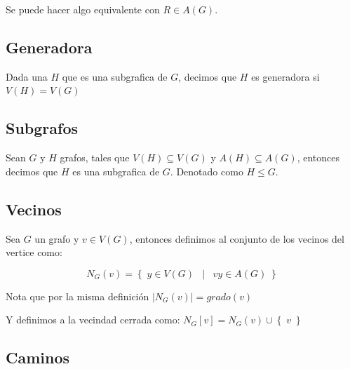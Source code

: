 \documentclass[12pt, fleqn]{report}                             %
\DeclareMathOperator \Space     {\quad}                         %
\DeclareMathOperator \MiniSpace {\;}                            %
\newcommand \Such           {\MiniSpace | \MiniSpace}           %
\theoremstyle{break}                                            %
\newcommand{\Set}[1]            {\left\{ \; #1 \; \right\}}     %
\begin{document}
                Se puede hacer algo equivalente con $R \in A(G)$.

            \subsection{Generadora}

                Dada una $H$ que es una subgrafica de $G$, decimos que $H$ es generadora si $V(H) = V(G)$


            \subsection{Subgrafos}

                Sean $G$ y $H$ grafos, tales que $V(H) \subseteq V(G)$ y $A(H) \subseteq A(G)$, entonces decimos que 
                $H$ es una subgrafica de $G$. Denotado como $H \leq G$.


            \subsection{Vecinos}

                Sea $G$ un grafo y $v \in V(G)$, entonces definimos al conjunto de los vecinos del vertice
                como:

                \begin{equation*}
                    N_G(v) = \Set{y \in V(G) \Such{ vy \in A(G)}}
                \end{equation*}

                Nota que por la misma definición $|N_G(v)| = grado(v)$

                Y definimos a la vecindad cerrada como:
                $N_G[v] = N_G(v) \cup \Set{v}$
          
            \subsection{Caminos}
\end{document}
